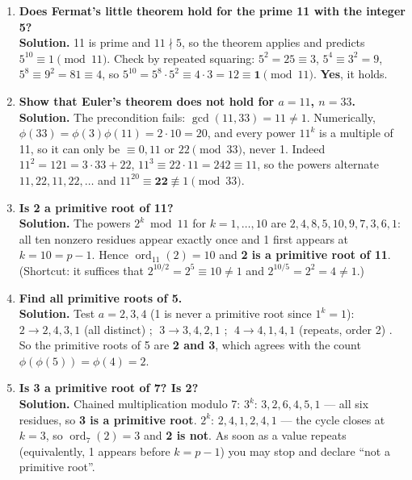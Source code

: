 \begin{enumerate}[leftmargin=1.6em,itemsep=4pt]
  \item \textbf{Does Fermat's little theorem hold for the prime 11 with the integer 5?}\\
  \textbf{Solution.} 11 is prime and $11 \nmid 5$, so the theorem applies and predicts $5^{10} \equiv 1 \pmod{11}$. Check by repeated squaring: $5^2 = 25 \equiv 3$, $5^4 \equiv 3^2 = 9$, $5^8 \equiv 9^2 = 81 \equiv 4$, so $5^{10} = 5^8 \cdot 5^2 \equiv 4 \cdot 3 = 12 \equiv \mathbf{1} \pmod{11}$. \textbf{Yes}, it holds.
  \item \textbf{Show that Euler's theorem does not hold for $a = 11$, $n = 33$.}\\
  \textbf{Solution.} The precondition fails: $\gcd(11, 33) = 11 \ne 1$. Numerically, $\phi(33) = \phi(3)\phi(11) = 2 \cdot 10 = 20$, and every power $11^k$ is a multiple of 11, so it can only be $\equiv 0, 11$ or $22 \pmod{33}$, never 1. Indeed $11^2 = 121 = 3 \cdot 33 + 22$, $11^3 \equiv 22 \cdot 11 = 242 \equiv 11$, so the powers alternate $11, 22, 11, 22, \dots$ and $11^{20} \equiv \mathbf{22} \not\equiv 1 \pmod{33}$.
  \item \textbf{Is 2 a primitive root of 11?}\\
  \textbf{Solution.} The powers $2^k \bmod 11$ for $k = 1, \dots, 10$ are $2, 4, 8, 5, 10, 9, 7, 3, 6, 1$: all ten nonzero residues appear exactly once and 1 first appears at $k = 10 = p - 1$. Hence $\operatorname{ord}_{11}(2) = 10$ and \textbf{2 is a primitive root of 11}. (Shortcut: it suffices that $2^{10/2} = 2^5 \equiv 10 \ne 1$ and $2^{10/5} = 2^2 = 4 \ne 1$.)
  \item \textbf{Find all primitive roots of 5.}\\
  \textbf{Solution.} Test $a = 2, 3, 4$ (1 is never a primitive root since $1^k = 1$):
  $2 \to 2, 4, 3, 1$ (all distinct) \checkmark; $\;3 \to 3, 4, 2, 1$ \checkmark; $\;4 \to 4, 1, 4, 1$ (repeats, order 2) \texttimes.
  So the primitive roots of 5 are \textbf{2 and 3}, which agrees with the count $\phi(\phi(5)) = \phi(4) = 2$.
  \item \textbf{Is 3 a primitive root of 7? Is 2?}\\
  \textbf{Solution.} Chained multiplication modulo 7: $3^k$: $3, 2, 6, 4, 5, 1$ — all six residues, so \textbf{3 is a primitive root}. $2^k$: $2, 4, 1, 2, 4, 1$ — the cycle closes at $k = 3$, so $\operatorname{ord}_7(2) = 3$ and \textbf{2 is not}. As soon as a value repeats (equivalently, 1 appears before $k = p - 1$) you may stop and declare ``not a primitive root''.

\end{enumerate}

